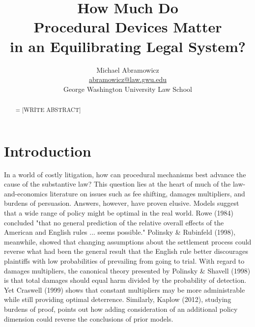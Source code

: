 \documentclass{article}
\newenvironment{nohyphen}
  {\tolerance=1%
   \emergencystretch=\maxdimen%
   \hyphenpenalty=10000%
   \hbadness=10000}%
  {\par}%
\begin{document}
\title{How Much Do \\ Procedural Devices Matter \\ in an Equilibrating Legal System?}
\author{Michael Abramowicz \\ \href{mailto:abramowicz@law.gwu.edu}{abramowicz@law.gwu.edu} \\ George Washington University Law School}

\maketitle

\begin{abstract}
\begin{nohyphen}
[WRITE ABSTRACT]
\end{nohyphen}
\end{abstract}

\section{Introduction}

In a world of costly litigation, how can procedural mechanisms best advance the cause of the substantive law? This question lies at the heart of much of the law-and-economics literature on issues such as fee shifting, damages multipliers, and burdens of persuasion. Answers, however, have proven elusive. Models suggest that a wide range of policy might be optimal in the real world. Rowe (1984) concluded "that no general prediction of the relative overall effects of the American and English rules ... seems possible." Polinsky \& Rubinfeld (1998), meanwhile, showed that changing assumptions about the settlement process could reverse what had been the general result that the English rule better discourages plaintiffs with low probabilities of prevailing from going to trial. With regard to damages multipliers, the canonical theory presented by Polinsky \& Shavell (1998) is that total damages should equal harm divided by the probability of detection. Yet Craswell  (1999) shows that constant multipliers may be more administrable while still providing optimal deterrence. Similarly, Kaplow (2012), studying burdens of proof, points out how adding consideration of an additional policy dimension could reverse the conclusions of prior models. 
\end{document}
